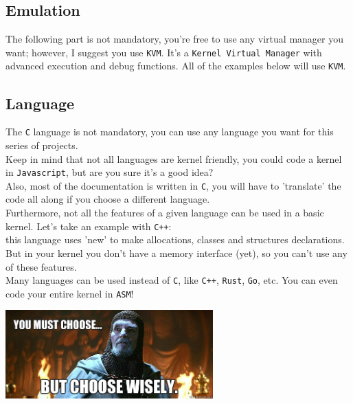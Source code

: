 \documentclass{42-en}
\begin{document}
        \subsection{Emulation}
        The following part is not mandatory, you're free to use any virtual
        manager you want; however, I suggest you use \texttt{KVM}.
        It's a \texttt{Kernel Virtual Manager} with advanced execution
        and debug functions.
        All of the examples below will use \texttt{KVM}.
        \subsection{Language}
            The \texttt{C} language is not mandatory, you can use any language
            you want for this series of projects.\\
            Keep in mind that not all languages are kernel friendly, you could
            code a kernel in \texttt{Javascript}, but are you sure it's a
            good idea?\\
            Also, most of the documentation is written in \texttt{C}, you will
            have to 'translate' the code all along if you choose a different
            language.\\

            Furthermore, not all the features of a given language can be used
            in a basic kernel. Let's take an example with \texttt{C++}:\\
            this language uses 'new' to make allocations, classes and
            structures declarations. But in your kernel you don't have a memory
            interface (yet), so you can't use any of these features.\\

            Many languages can be used instead of \texttt{C},
            like \texttt{C++}, \texttt{Rust}, \texttt{Go}, etc.
            You can even code your entire kernel in \texttt{ASM}!\\
            \begin{center}
              \includegraphics[width=8cm]{choose.jpg}
            \end{center}
\newpage
\end{document}
